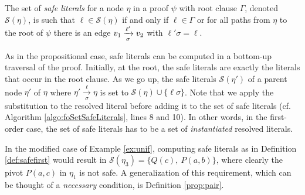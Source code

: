 %



\begin{definition}\label{def:safefirst}
The set of \emph{safe literals} for a node $\eta$ in a proof $\psi$ with root clause $\Gamma$, denoted $\mathcal{S}(\eta)$, is such that $\ell \in \mathcal{S}(\eta)$ if and only if $\ell \in \Gamma$ or for all paths from $\eta$ to the root of $\psi$ there is an edge $v_1
\xrightarrow[\sigma]{\ell'} v_2$ with $\ell' \sigma = \ell$.
\end{definition}

\noindent
As in the propositional case, safe literals can be computed in a bottom-up traversal of the proof. Initially, at the root, the safe literals are exactly the literals that occur in the root clause. As we go up, the safe literals $\mathcal{S}(\eta')$ of a parent node $\eta'$ of $\eta$ where $\eta'
\xrightarrow[\sigma]{\ell} \eta$ is set to $\mathcal{S}(\eta) \cup \{ \ell \sigma \}$. Note that we apply the substitution to the resolved literal before adding it to the set of safe literals (cf. Algorithm \ref{algo:foSetSafeLiterals}, lines 8 and 10). In other words, in the first-order case, the set of safe literals has to be a set of \emph{instantiated} resolved literals.

In the modified case of Example \ref{ex:unif}, computing safe literals as in Definition \ref{def:safefirst} would result in $\mathcal{S}(\eta_3)=\{Q(c),~P(a,b)\}$, where clearly the pivot $P(a,c)$ in $\eta_1$ is not safe. A generalization of this requirement, which can be thought of a \emph{necessary} condition, is Definition \ref{prop:pair}.




